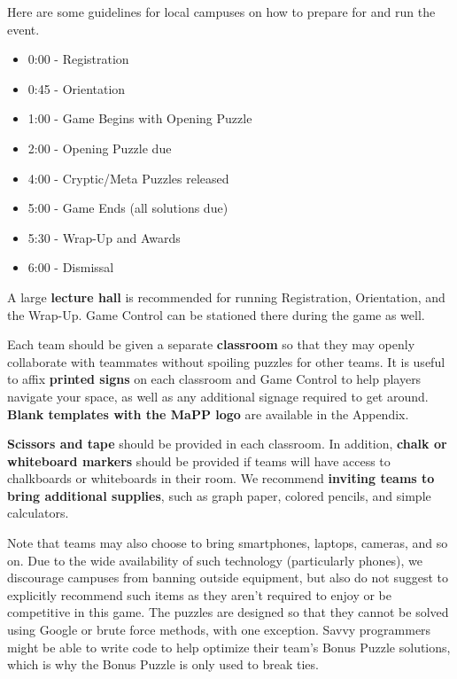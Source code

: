 
Here are some guidelines for local campuses on how to prepare for and
run the event.


\begin{itemize}
  \item 0:00 - Registration
  \item 0:45 - Orientation
  \item 1:00 - Game Begins with Opening Puzzle
  \item 2:00 - Opening Puzzle due
  \item 4:00 - Cryptic/Meta Puzzles released
  \item 5:00 - Game Ends (all solutions due)
  \item 5:30 - Wrap-Up and Awards
  \item 6:00 - Dismissal
\end{itemize}


A large \textbf{lecture hall} is recommended for running Registration,
Orientation, and the Wrap-Up. Game Control can be stationed there during
the game as well.

Each team should be given a separate \textbf{classroom} so that they may
openly collaborate with teammates without spoiling puzzles for other teams.
It is useful to affix \textbf{printed signs} on each classroom and Game
Control to help players navigate your space, as well as any additional
signage required to get around. \textbf{Blank templates with the MaPP logo}
are available in the Appendix.


\textbf{Scissors and tape} should be provided in each classroom.
In addition, \textbf{chalk or whiteboard markers} should be provided if
teams will have access to chalkboards or whiteboards in their room.
We recommend \textbf{inviting teams to bring additional supplies}, such as
graph paper, colored pencils, and simple calculators.

Note that teams may also choose to bring smartphones, laptops, cameras,
and so on. Due to the wide availability of such technology (particularly
phones), we discourage campuses from banning outside equipment, but also
do not suggest to explicitly recommend such items as they aren't required
to enjoy or be competitive in this game. The puzzles are
designed so that they cannot be solved using Google or brute force methods,
with one exception. Savvy programmers might be able to write code to
help optimize their team's Bonus Puzzle solutions, which is why the Bonus
Puzzle is only used to break ties.

